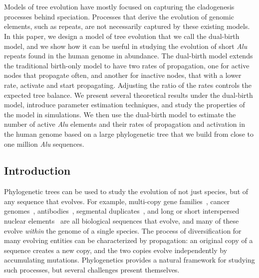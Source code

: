 \newcommand{\BL}{D}
\newcommand{\CH}[1]{c(#1)}
\newcommand{\LB}[1]{l_{#1}}
\newcommand{\LBh}{n_l}
\newcommand{\NV}{N}
\newcommand{\RBh}{n_r}
\newcommand{\RN}{\psi}
\newcommand{\RNALL}{\Psi}
\newcommand{\SD}{\omega}
\newcommand{\SDALL}{\Omega}
\newcommand{\TBL}{L}
\newcommand{\TO}{T^\SD}
\newcommand{\TR}{T^\RN}
\newcommand{\TRO}{\TR_{\SD}}
\newcommand{\bl}{\delta}
\newcommand{\child}[2]{#1_{#2}}
\newcommand{\defeq}{=}
\newcommand{\la}{\lambda_a}
\newcommand{\lb}{\lambda_b}
\newcommand{\li}{\lambda_i}
\newcommand{\leaf}{\otimes}
\newcommand{\tav}{\tau'}
\newcommand{\tO}{t^\SD}

\newtheorem{conjecture}{Conjecture}
\newtheorem{corollary}{Corollary}
\newtheorem{lemma}{Lemma}
\newtheorem{theorem}{Theorem}

\chapter{\dualbirthtitle}
\label{chap:dualbirth}
\clearpage

Models of tree evolution have mostly focused on capturing the cladogenesis processes behind speciation. Processes that derive the evolution of genomic elements, such as repeats, are not necessarily captured by these existing models. In this paper, we design a model of tree evolution that we call the dual-birth model, and we show how it can be useful in studying the evolution of short \textit{Alu} repeats found in the human genome in abundance. The dual-birth model extends the traditional birth-only model to have two rates of propagation, one for active nodes that propagate often, and another for inactive nodes, that with a lower rate, activate and start propagating. Adjusting the ratio of the rates controls the expected tree balance. We present several theoretical results under the dual-birth model, introduce parameter estimation techniques, and study the properties of the model in simulations. We then use the dual-birth model to estimate the number of active \textit{Alu} elements and their rates of propagation and activation in the human genome based on a large phylogenetic tree that we build from close to one million \textit{Alu} sequences.

\section{Introduction}
Phylogenetic trees can be used to study the evolution of not just species, but of any sequence that evolves. For example, multi-copy gene families~\cite{Page1997,Finn2014}, cancer genomes~\cite{Nowell1976,El-Kebir2016}, antibodies~\cite{Litman1993,Robinson2015,Safonova2015}, segmental duplicates~\cite{Bailey2006,Jiang2007}, and long or short interspersed nuclear elements~\cite{Dewannieux2003} are all biological sequences that evolve, and many of these evolve \textit{within} the genome of a single species. The process of diversification for many evolving entities can be characterized by propagation: an original copy of a sequence creates a new copy, and the two copies evolve independently by accumulating mutations. Phylogenetics provides a natural framework for studying such processes, but several challenges present themselves.

